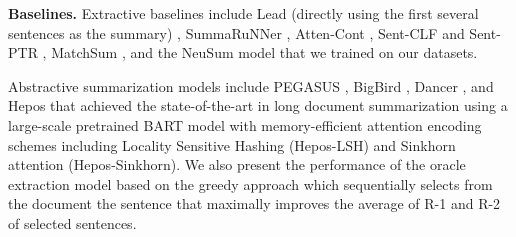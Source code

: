 \documentclass[11pt]{article}
\begin{document}
\begin{table}

\centering
{}
\caption{ \label{tab:datasets} An overview of datasets used in this paper. We count only strings composed of letters and numbers for \# of words. }
\end{table}
\noindent \textbf{Baselines.}
Extractive baselines include Lead (directly using the first several sentences as the summary) \cite{dancerp}, SummaRuNNer \cite{nallapati2016summarunner}, Atten-Cont \cite{xiao-carenini-2019-extractive}, Sent-CLF and Sent-PTR \cite{ pilault-etal-2020-extractive}, MatchSum \cite{zhong2020extractive}, and the NeuSum model \cite{zhou-etal-2018-neural-document} that we trained on our datasets.

Abstractive summarization models include PEGASUS \cite{pmlr-v119-zhang20ae}, BigBird \cite{NEURIPS2020_c8512d14}, Dancer \cite{dancerp}, and Hepos \cite{huang2021efficient} that achieved the state-of-the-art in long document summarization using a large-scale pretrained BART model \cite{lewis-etal-2020-bart} with memory-efficient attention encoding schemes including Locality Sensitive Hashing \cite{Kitaev2020Reformer:} (Hepos-LSH) and Sinkhorn attention (Hepos-Sinkhorn). We also present the performance of the oracle extraction model based on the greedy approach \cite{nallapati2016summarunner} which sequentially selects from the document the sentence that maximally improves the average of R-1 and R-2 of selected sentences. 
\end{document}
